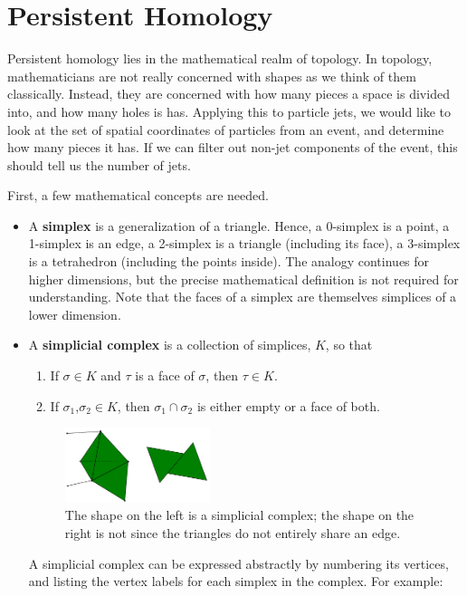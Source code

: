 \documentclass[a4paper,12pt]{report}
\begin{document}
\section{Persistent Homology}\label{sec:ph}

Persistent homology lies in the mathematical realm of topology. In topology, mathematicians are not really concerned with shapes as we think of them classically. Instead, they are concerned with how many pieces a space is divided into, and how many holes is has. Applying this to particle jets, we would like to look at the set of spatial coordinates of particles from an event, and determine how many pieces it has. If we can filter out non-jet components of the event, this should tell us the number of jets.

First, a few mathematical concepts are needed. 
\begin{itemize}
\item A \textbf{simplex} is a generalization of a triangle. Hence, a 0-simplex is a point, a 1-simplex is an edge, a 2-simplex is a triangle (including its face), a 3-simplex is a tetrahedron (including the points inside). The analogy continues for higher dimensions, but the precise mathematical definition is not required for understanding. Note that the faces of a simplex are themselves simplices of a lower dimension.
\item A \textbf{simplicial complex} is a collection of simplices, $K$, so that 
\begin{enumerate}
 \item If $\sigma\in K$ and $\tau$ is a face of $\sigma$, then $\tau\in K$.
 \item If $\sigma_1$,$\sigma_2\in K$, then $\sigma_1\cap\sigma_2$ is either empty or a face of both.
\end{enumerate}
  \singlespacing
\begin{figure}[!htbp]
 \centering
 \includegraphics[width=0.4\textwidth]{compare.pdf}
 \caption{\label{fig:compare} The shape on the left is a simplicial complex; the shape on the right is not since the triangles do not entirely share an edge.}
\end{figure}
\doublespacing
A simplicial complex can be expressed abstractly by numbering its vertices, and listing the vertex labels for each simplex in the complex. For example:

\end{itemize}
\end{document}

